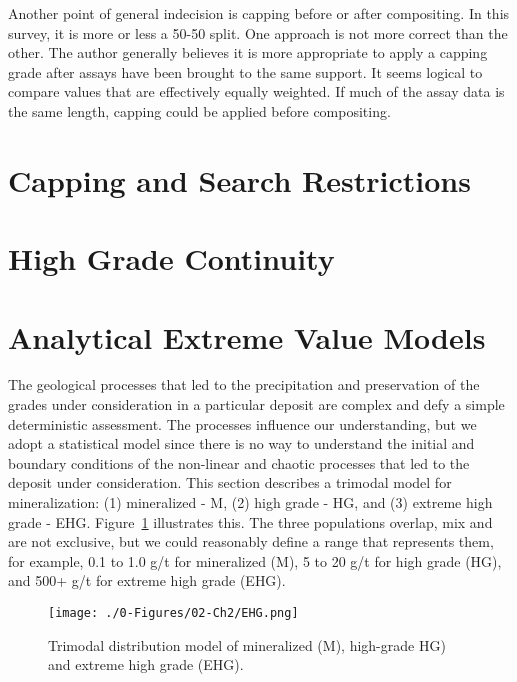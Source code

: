 Another point of general indecision is capping before or after compositing. In this survey, it is more or less a 50-50 split. One approach is not more correct than the other. The author generally believes it is more appropriate to apply a capping grade after assays have been brought to the same support. It seems logical to compare values that are effectively equally weighted. If much of the assay data is the same length, capping could be applied before compositing. 

\section{Capping and Search Restrictions}
\label{sec:capping}



\section{High Grade Continuity}
\label{sec:continuity}



\section{Analytical Extreme Value Models}
\label{sec:analytical}

The geological processes that led to the precipitation and preservation of the grades under consideration in a particular deposit are complex and defy a simple deterministic assessment. The processes influence our understanding, but we adopt a statistical model since there is no way to understand the initial and boundary conditions of the non-linear and chaotic processes that led to the deposit under consideration. This section describes a trimodal model for mineralization: (1) mineralized - M, (2) high grade - HG, and (3) extreme high grade - EHG. Figure~\ref{fig:ehg} illustrates this. The three populations overlap, mix and are not exclusive, but we could reasonably define a range that represents them, for example, 0.1 to 1.0 g/t for mineralized (M), 5 to 20 g/t for high grade (HG), and 500+ g/t for extreme high grade (EHG).

\begin{figure}[htb!]
    \centering
    \texttt{[image: ./0-Figures/02-Ch2/EHG.png]}
    \caption{Trimodal distribution model of mineralized (M), high-grade HG) and extreme high grade (EHG).}
    \label{fig:ehg}
\end{figure}


